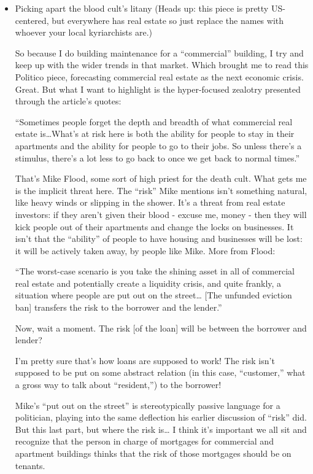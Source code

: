 \documentclass[11pt]{article}
\begin{document}
\begin{itemize}
\item Picking apart the blood cult's litany
\label{sec:org0239d73}
(Heads up: this piece is pretty US-centered, but everywhere has real estate so just replace the names with whoever your local kyriarchists are.)

So because I do building maintenance for a “commercial” building, I try and keep up with the wider trends in that market. Which brought me to read this Politico piece, forecasting commercial real estate as the next economic crisis. Great. But what I want to highlight is the hyper-focused zealotry presented through the article’s quotes:

“Sometimes people forget the depth and breadth of what commercial real estate is…What’s at risk here is both the ability for people to stay in their apartments and the ability for people to go to their jobs. So unless there’s a stimulus, there’s a lot less to go back to once we get back to normal times.”

That’s Mike Flood, some sort of high priest for the death cult. What gets me is the implicit threat here. The “risk” Mike mentions isn’t something natural, like heavy winds or slipping in the shower. It’s a threat from real estate investors: if they aren’t given their blood - excuse me, money - then they will kick people out of their apartments and change the locks on businesses. It isn’t that the “ability” of people to have housing and businesses will be lost: it will be actively taken away, by people like Mike. More from Flood:

“The worst-case scenario is you take the shining asset in all of commercial real estate and potentially create a liquidity crisis, and quite frankly, a situation where people are put out on the street… [The unfunded eviction ban] transfers the risk to the borrower and the lender.”

Now, wait a moment. The risk [of the loan] will be between the borrower and lender?

I’m pretty sure that’s how loans are supposed to work! The risk isn’t supposed to be put on some abstract relation (in this case, “customer,” what a gross way to talk about “resident,”) to the borrower!

Mike’s “put out on the street” is stereotypically passive language for a politician, playing into the same deflection his earlier discussion of “risk” did. But this last part, but where the risk is… I think it’s important we all sit and recognize that the person in charge of mortgages for commercial and apartment buildings thinks that the risk of those mortgages should be on tenants.


\end{itemize}
\end{document}

